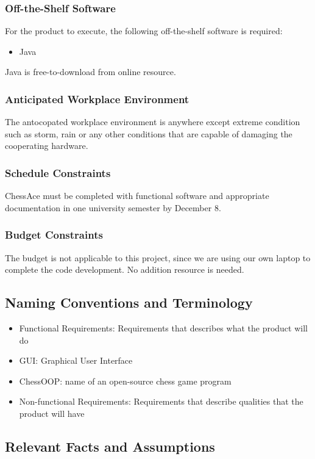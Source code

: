 \documentclass[12pt, titlepage]{article}
\begin{document}
\subsubsection{Off-the-Shelf Software}
For the product to execute, the following off-the-shelf software is required:
\begin{itemize}
\item Java
\end{itemize}
Java is free-to-download from online resource.
\subsubsection{Anticipated Workplace Environment}
The antocopated workplace environment is anywhere except extreme condition such as storm, rain or any other conditions that are capable of damaging the cooperating hardware.
\subsubsection{Schedule Constraints}
ChessAce must be completed with functional software and appropriate documentation in one university semester by December 8.
\subsubsection{Budget Constraints}
The budget is not applicable to this project, since we are using our own laptop to complete the code development. No addition resource is needed.
\subsection{Naming Conventions and Terminology}
\begin{itemize}
\item Functional Requirements: Requirements that describes what the product will do
\item GUI: Graphical User Interface
\item ChessOOP: name of an open-source chess game program
\item Non-functional Requirements: Requirements that describe qualities that the product will have

\end{itemize}

\subsection{Relevant Facts and Assumptions}
\end{document}
